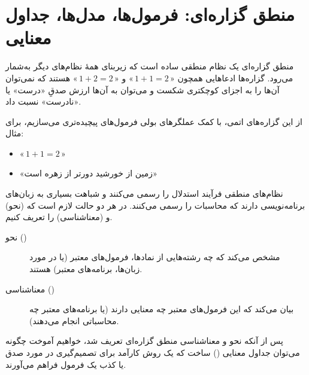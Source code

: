 \chapter*{منطق گزاره‌ای: فرمول‌ها، مدل‌ها، جداول معنایی}

منطق گزاره‌ای یک نظام منطقی ساده است که زیربنای همهٔ نظام‌های دیگر به‌شمار می‌رود. گزاره‌ها ادعاهایی همچون «\(\,1+1=2\,\)» و «\(\,1+2=2\,\)» هستند که نمی‌توان آن‌ها را به اجزای کوچکتری شکست و می‌توان به آن‌ها ارزش صدقِ «درست» یا «نادرست» نسبت داد.

از این گزاره‌های اتمی، با کمک عملگرهای بولی فرمول‌های پیچیده‌تری می‌سازیم، برای مثال:
\begin{itemize}
  \item «\(\,1+1=2\,\)»
  \item «زمین از خورشید دورتر از زهره است»
\end{itemize}

نظام‌های منطقی فرآیند استدلال را رسمی می‌کنند و شباهت بسیاری به زبان‌های برنامه‌نویسی دارند که محاسبات را رسمی می‌کنند. در هر دو حالت لازم است که  (نحو) و  (معناشناسی) را تعریف کنیم.

\begin{description}
  \item[نحو ()] مشخص می‌کند که چه رشته‌هایی از نمادها، فرمول‌های معتبر (یا در مورد زبان‌ها، برنامه‌های معتبر) هستند.
  \item[معناشناسی ()] بیان می‌کند که این فرمول‌های معتبر چه معنایی دارند (یا برنامه‌های معتبر چه محاسباتی انجام می‌دهند).
\end{description}

پس از آنکه نحو و معناشناسی منطق گزاره‌ای تعریف شد، خواهیم آموخت چگونه می‌توان جداول معنایی () ساخت که یک روش کارآمد برای تصمیم‌گیری در مورد صدق یا کذب یک فرمول فراهم می‌آورند.







